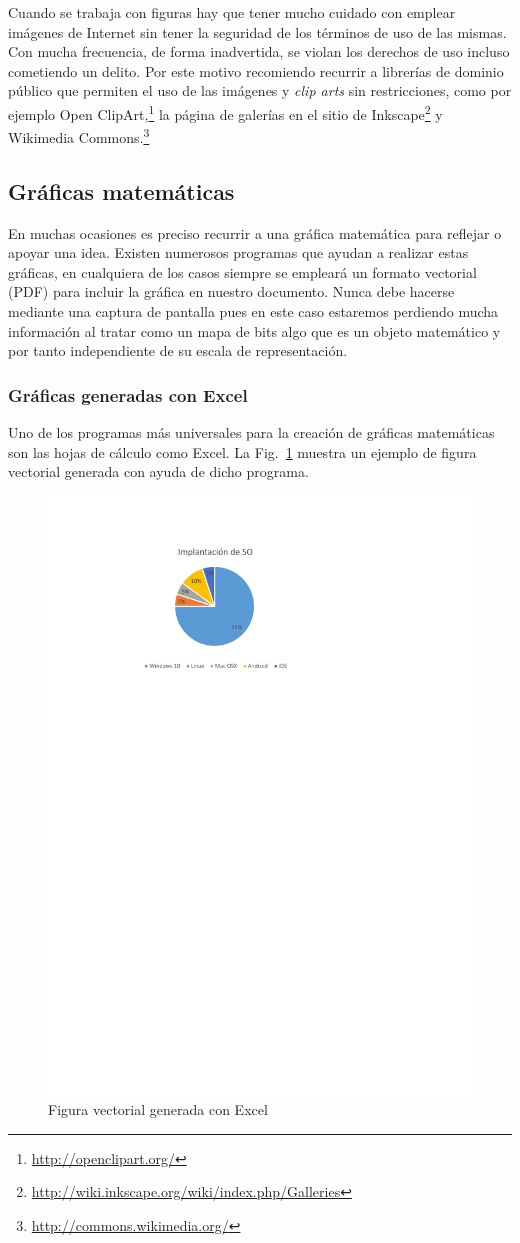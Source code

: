 \documentclass[11pt,a4paper]{article}
\begin{document}
Cuando se trabaja con figuras hay que tener mucho cuidado con emplear imágenes de Internet sin tener la seguridad de los términos de uso de las mismas. Con mucha frecuencia, de forma inadvertida, se violan los derechos de uso incluso cometiendo un delito. Por este motivo recomiendo recurrir a librerías de dominio público que permiten el uso de las imágenes y \emph{clip arts} sin restricciones, como por ejemplo Open ClipArt,\footnote{\url{http://openclipart.org/}} la página de galerías en el sitio de Inkscape\footnote{\url{http://wiki.inkscape.org/wiki/index.php/Galleries}} y Wikimedia Commons.\footnote{\url{http://commons.wikimedia.org/}}



\newpage
\subsection{Gráficas matemáticas}
En muchas ocasiones es preciso recurrir a una gráfica matemática para reflejar o apoyar una idea. Existen numerosos programas que ayudan a realizar estas gráficas, en cualquiera de los casos siempre se empleará un formato vectorial (PDF) para incluir la gráfica en nuestro documento. Nunca debe hacerse mediante una captura de pantalla pues en este caso estaremos perdiendo mucha información al tratar como un mapa de bits algo que es un objeto matemático y por tanto independiente de su escala de representación.

\subsubsection{Gráficas generadas con Excel}
Uno de los programas más universales para la creación de gráficas matemáticas son las hojas de cálculo como Excel. La Fig.~\ref{fig:excel} muestra un ejemplo de figura vectorial generada con ayuda de dicho programa.

\begin{figure}[htb]
	\centering
	\includegraphics[width=0.5\linewidth]{EjFigsExcelOrig} 
	\caption[Gráfico de Excel]{Figura vectorial generada con Excel}
	\label{fig:excel}
\end{figure}
\end{document}
